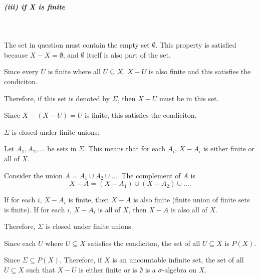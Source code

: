 \documentclass[12pt]{article}
\begin{document}
\subparagraph{(iii) if X is finite}
\ \\
\par \hspace*{1em}The set in question must contain the empty set \( \emptyset \). This property is satisfied because \( X - X = \emptyset \), and \( \emptyset \) itself is also part of the set. \\
\par \hspace*{1em}Since every \(U\) is finite where all \( U \subseteq X \), \(X-U\) is also finite and this satisfies the condiciton. \\
\par \hspace*{1em}Therefore, if this set is denoted by \( \Sigma \), then \( X-U \) must be in this set. \\
\par \hspace*{1em}Since \( X - (X-U) = U\) is finite, this satisfies the condiciton. \\

\par \hspace*{1em}$\Sigma$ is closed under finite unions:

\par \hspace*{1em}Let $A_1, A_2, \ldots$ be sets in $\Sigma$. This means that for each $A_i$, $X - A_i$ is either finite or all of $X$.

\par \hspace*{1em}Consider the union $A = A_1 \cup A_2 \cup \ldots$. The complement of $A$ is
\[
X - A = (X - A_1) \cup (X - A_2) \cup \ldots.
\]

\par \hspace*{1em}If for each $i$, $X - A_i$ is finite, then $X - A$ is also finite (finite union of finite sets is finite). If for each $i$, $X - A_i$ is all of $X$, then $X - A$ is also all of $X$. \\

\par \hspace*{1em}Therefore, $\Sigma$ is closed under finite unions.

\par \hspace*{1em}Since each \( U \) where \( U \subseteq X \) satisfies the condiciton, the set of all \( U \subseteq X \) is \( P(X) \). \\
\par \hspace*{1em}Since \( \Sigma \subseteq P(X) \), Therefore, if \( X \) is an uncountable infinite set, the set of all \( U \subseteq X \) such that \( X - U \) is either finite or is \(\emptyset\) is a \( \sigma \)-algebra on \( X \).
\end{document}
